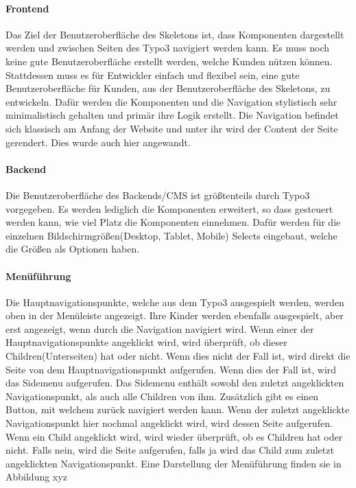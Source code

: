 \paragraph{Frontend} 
\linebreak
Das Ziel der Benutzeroberfläche des Skeletons ist, dass Komponenten dargestellt werden und zwischen Seiten des Typo3 navigiert werden kann. Es muss noch keine gute Benutzeroberfläche erstellt werden, welche Kunden nützen können. Stattdessen muss es für Entwickler einfach und flexibel sein, eine gute Benutzeroberfläche für Kunden, aus der Benutzeroberfläche des Skeletons, zu entwickeln. Dafür werden die Komponenten und die Navigation stylistisch sehr minimalistisch gehalten und primär ihre Logik erstellt. Die Navigation befindet sich klassisch am Anfang der Website und unter ihr wird der Content der Seite gerendert. Dies wurde auch hier angewandt.


\paragraph{Backend} 
\linebreak 
Die Benutzeroberfläche des Backends/CMS ist größtenteils durch Typo3 vorgegeben. Es werden lediglich die Komponenten erweitert, so dass gesteuert werden kann, wie viel Platz die Komponenten einnehmen. Dafür werden für die einzelnen Bildschirmgrößen(Desktop, Tablet, Mobile) Selects eingebaut, welche die Größen als Optionen haben.

\paragraph{Menüführung}  
\linebreak
Die Hauptnavigationspunkte, welche aus dem Typo3 ausgespielt werden, werden oben in der Menüleiste angezeigt. Ihre Kinder werden ebenfalls ausgespielt, aber erst angezeigt, wenn durch die Navigation navigiert wird. Wenn einer der Hauptnavigationspunkte angeklickt wird, wird überprüft, ob dieser Children(Unterseiten) hat oder nicht. Wenn dies nicht der Fall ist, wird direkt die Seite von dem Hauptnavigationspunkt aufgerufen. Wenn dies der Fall ist, wird das Sidemenu aufgerufen. Das Sidemenu enthält sowohl den zuletzt angeklickten Navigationspunkt, als auch alle Children von ihm. Zusätzlich gibt es einen Button, mit welchem zurück navigiert werden kann. Wenn der zuletzt angeklickte Navigationspunkt hier nochmal angeklickt wird, wird dessen Seite aufgerufen. Wenn ein Child angeklickt wird, wird wieder überprüft, ob es Children hat oder nicht. Falls nein, wird die Seite aufgerufen, falls ja wird das Child zum zuletzt angeklickten Navigationspunkt. Eine Darstellung der Menüführung finden sie in Abbildung xyz


